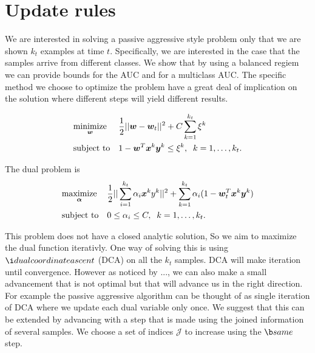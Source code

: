 \section{Update rules}

We are interested in solving a passive aggressive style problem only that we are shown $k_t$ examples at time $t$. Specifically, we are interested in the case that the samples arrive from different classes. We show that by using a balanced regiem we can provide bounds for the AUC and for a multiclass AUC. The specific method we choose to optimize the problem have a great deal of implication on the solution where different steps will yield different results.

\begin{equation*}
\begin{aligned}
& \underset{\bm{w}}{\text{minimize}}
& & \frac{1}{2} || \bm{w} - \bm{w}_t ||^2 + C \sum\limits_{k=1}^{k_t}{\xi^k} \\
& \text{subject to}
& & 1 - \bm{w}^T \bm{x}^k \bm{y}^k \leq \xi^k, \;
 \; k = 1, \ldots, k_t.
\end{aligned}
\end{equation*}


The dual problem is 
\begin{equation*}
\begin{aligned}
& \underset{\bm{\alpha}}{\text{maximize}}
& & \frac{1}{2} || \sum\limits_{i=1}^{k_t} {\alpha_i \bm{x}^k y^k}||^2 + \sum\limits_{k=1}^{k_t} {\alpha_i (1 - \bm{w}_t^T \bm{x}^k \bm{y}^k }) \\
& \text{subject to}
& & 0 \leq \alpha_i \leq C, \;
 \; k = 1, \ldots, k_t.
\end{aligned}
\end{equation*}


This problem does not have a closed analytic solution, So we aim to maximize the dual function iterativly. One way of solving this is using ${\i dual coordinate ascent}$ (DCA) on all the $k_t$ samples. DCA will make iteration until convergence. However as noticed by ...,  we can also make a small advancement that is not optimal but that will advance us in the right direction. For example the passive aggressive algorithm can be thought of as single iteration of DCA where we update each dual variable only once. We suggest that this can be extended by advancing with a step that is made using the joined information of several samples. We choose a set of indices $\mathcal{J} $ to increase using the ${\b same }$ step.

